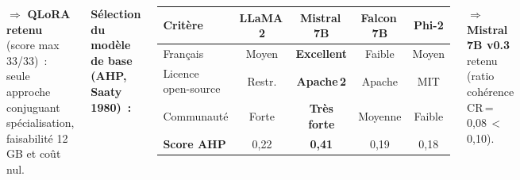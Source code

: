 \documentclass[a0paper, portrait, 25pt]{tikzposter}
\begin{document}
\begin{columns}
{    \vspace{8pt}
    $\Rightarrow$ \textbf{QLoRA retenu} (score max 33/33)~: seule approche conjuguant spécialisation, faisabilité 12\,GB et coût nul.

    \vspace{12pt}
    \textbf{Sélection du modèle de base (AHP, Saaty 1980)~:}

    \vspace{6pt}
    \begin{center}
    \renewcommand{\arraystretch}{1.4}
    \large
    \begin{tabular}{@{} l c c c c @{}}
        \toprule
        \textbf{Critère}
            & \textbf{LLaMA\,2}
            & \textbf{Mistral\,7B}
            & \textbf{Falcon\,7B}
            & \textbf{Phi-2} \\
        \midrule
        Français
            & \cellcolor{resultOrange!25}Moyen
            & \cellcolor{resultGreen!25}\textbf{Excellent}
            & \cellcolor{resultRed!25}Faible
            & \cellcolor{resultOrange!25}Moyen \\
        Licence open-source
            & \cellcolor{resultOrange!25}Restr.
            & \cellcolor{resultGreen!25}\textbf{Apache\,2}
            & \cellcolor{resultGreen!25}Apache
            & \cellcolor{resultGreen!25}MIT \\
        Communauté
            & \cellcolor{resultGreen!25}Forte
            & \cellcolor{resultGreen!25}\textbf{Très forte}
            & \cellcolor{resultOrange!25}Moyenne
            & \cellcolor{resultRed!25}Faible \\
        \midrule
        \textbf{Score AHP}
            & 0{,}22
            & \cellcolor{resultGreen!30}\textbf{0{,}41}
            & 0{,}19
            & 0{,}18 \\
        \bottomrule
    \end{tabular}
    \end{center}

    \vspace{6pt}
    $\Rightarrow$ \textbf{Mistral 7B v0.3} retenu (ratio cohérence CR\,=\,0{,}08\,$<$\,0{,}10).

}


\end{columns}
\end{document}

